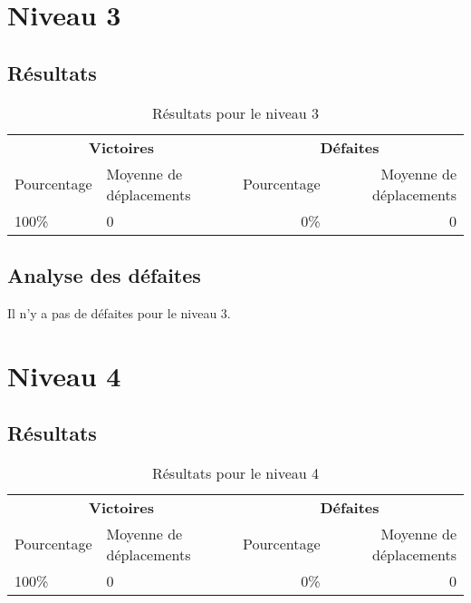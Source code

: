\section{Niveau 3}

\subsection{Résultats}

\begin{table}[!htpb]
    \begin{tabularx}{\textwidth}{lXrr}
        \toprule
        \multicolumn{2}{c}{\textbf{Victoires}} & \multicolumn{2}{c}{\textbf{Défaites}} \\
        \cmidrule(lr){1-2} \cmidrule(lr){3-4}
        Pourcentage & Moyenne de déplacements & Pourcentage & Moyenne de déplacements \\
        \midrule
        100\% & 0 & 0\% & 0 \\
        \bottomrule
    \end{tabularx}
    \caption{Résultats pour le niveau 3}
    \label{tab:res-niveau-3}
\end{table}

\subsection{Analyse des défaites}

Il n'y a pas de défaites pour le niveau 3.

\section{Niveau 4}

\subsection{Résultats}

\begin{table}[!htpb]
    \begin{tabularx}{\textwidth}{lXrr}
        \toprule
        \multicolumn{2}{c}{\textbf{Victoires}} & \multicolumn{2}{c}{\textbf{Défaites}} \\
        \cmidrule(lr){1-2} \cmidrule(lr){3-4}
        Pourcentage & Moyenne de déplacements & Pourcentage & Moyenne de déplacements \\
        \midrule
        100\% & 0 & 0\% & 0 \\
        \bottomrule
    \end{tabularx}
    \caption{Résultats pour le niveau 4}
    \label{tab:res-niveau-4}
\end{table}

